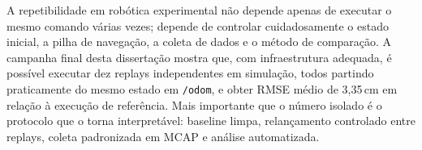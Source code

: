 A repetibilidade em robótica experimental não depende apenas de executar o mesmo
comando várias vezes; depende de controlar cuidadosamente o estado inicial, a
pilha de navegação, a coleta de dados e o método de comparação. A campanha final
desta dissertação mostra que, com infraestrutura adequada, é possível executar
dez replays independentes em simulação, todos partindo praticamente do mesmo
estado em \texttt{/\allowbreak odom}, e obter RMSE médio de 3,35\,cm em relação
à execução de referência. Mais importante que o número isolado é o protocolo que
o torna interpretável: baseline limpa, relançamento controlado entre replays,
coleta padronizada em MCAP e análise automatizada.

